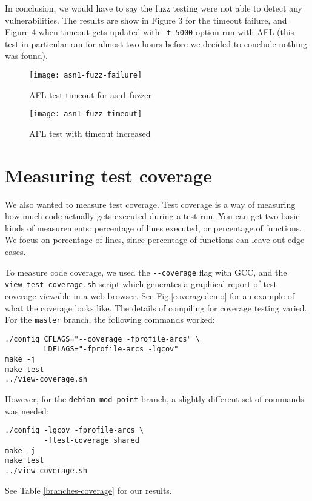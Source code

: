 \documentclass[conference]{IEEEtran}
\begin{document}
In conclusion, we would have to say the fuzz testing were not able to
detect any vulnerabilities. The results are show in Figure 3 for the
timeout failure, and Figure 4 when timeout gets updated with
\verb|-t 5000| option run with AFL (this test in particular ran for
almost two hours before we decided to conclude nothing was found).

\begin{figure}[h]
  \caption{AFL test timeout for asn1 fuzzer}
  \centering
  \texttt{[image: asn1-fuzz-failure]}
\end{figure}
\begin{figure}[h]
  \caption{AFL test with timeout increased}
  \centering
  \texttt{[image: asn1-fuzz-timeout]}
\end{figure}

\section{Measuring test coverage}
We also wanted to measure test coverage. Test coverage is a way of
measuring how much code actually gets executed during a test run. You
can get two basic kinds of measurements: percentage of lines executed,
or percentage of functions. We focus on percentage of lines, since
percentage of functions can leave out edge cases.

To measure code coverage, we used the \verb|--coverage| flag with GCC,
and the \verb|view-test-coverage.sh| script which generates a
graphical report of test coverage viewable in a web browser. See
Fig.\ref{coveragedemo} for an example of what the coverage looks
like. The details of compiling for coverage testing varied. For the
\verb|master| branch, the following commands worked:

\begin{verbatim}
./config CFLAGS="--coverage -fprofile-arcs" \
         LDFLAGS="-fprofile-arcs -lgcov"
make -j
make test
../view-coverage.sh
\end{verbatim}

However, for the \verb|debian-mod-point| branch, a slightly different
set of commands was needed:

\begin{verbatim}
./config -lgcov -fprofile-arcs \
         -ftest-coverage shared
make -j
make test
../view-coverage.sh
\end{verbatim}

See Table \ref{branches-coverage} for our results.
\end{document}
